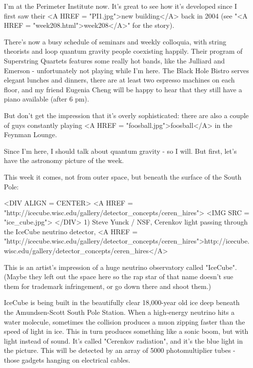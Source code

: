 

I'm at the Perimeter Institute now.  It's great to see how it's
developed since I first saw their <A HREF = "PI1.jpg">new building</A> 
back in 2004 (see "<A HREF = "week208.html">week208</A>" 
for the story).

There's now a busy schedule of seminars and weekly colloquia, with
string theorists and loop quantum gravity people coexisting happily.
Their program of Superstring Quartets features some really hot bands,
like the Julliard and Emerson - unfortunately not playing while I'm
here.  The Black Hole Bistro serves elegant lunches and dinners, there
are at least two espresso machines on each floor, and my friend
Eugenia Cheng will be happy to hear that they still have a piano
available (after 6 pm).

But don't get the impression that it's overly sophisticated: 
there are also a couple of guys constantly playing 
<A HREF = "foosball.jpg">foosball</A> in the Feynman Lounge.

Since I'm here, I should talk about quantum gravity - so I will.
But first, let's have the astronomy picture of the week.  

This week it comes, not from outer space, but beneath the surface of 
the South Pole:

<DIV ALIGN = CENTER>
<A HREF = "http://icecube.wisc.edu/gallery/detector_concepts/ceren_hires">
<IMG SRC = "ice_cube.jpg">
</DIV>
1) Steve Yunck / NSF, Cerenkov light passing through the IceCube neutrino
detector, <A HREF = "http://icecube.wisc.edu/gallery/detector_concepts/ceren_hires">http://icecube.wisc.edu/gallery/detector_concepts/ceren_hires</A>

This is an artist's impression of a huge neutrino observatory called
"IceCube".  (Maybe they left out the space here so the rap
star of that name doesn't sue them for trademark infringement, or go
down there and shoot them.)

IceCube is being built in the beautifully clear 18,000-year old ice deep
beneath the Amundsen-Scott South Pole Station.  When a high-energy 
neutrino hits a water molecule, sometimes the collision produces a 
muon zipping faster than the speed of light in ice.  This in turn 
produces something like a sonic boom, but with light instead of sound.  
It's called "Cerenkov radiation", and it's the blue light in the picture.  
This will be detected by an array of 5000 photomultiplier tubes - those 
gadgets hanging on electrical cables.  

